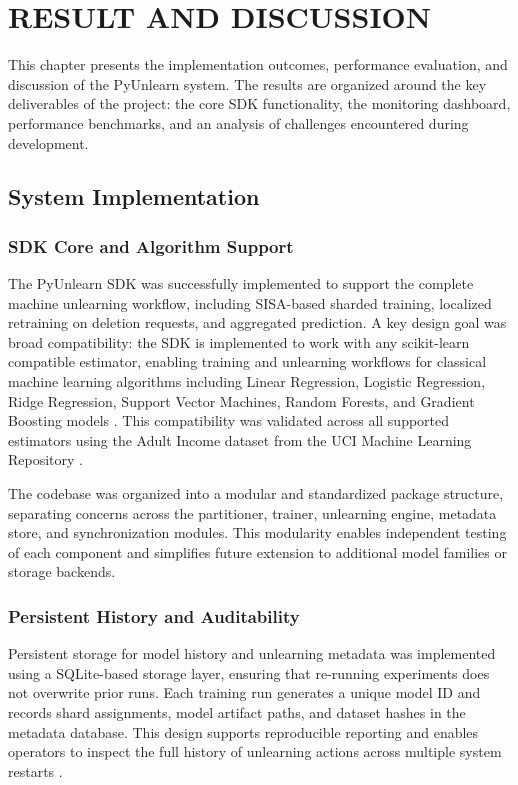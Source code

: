 \chapter{RESULT AND DISCUSSION}
\label{chap:results}

This chapter presents the implementation outcomes, performance evaluation, and discussion of the PyUnlearn system. The results are organized around the key deliverables of the project: the core SDK functionality, the monitoring dashboard, performance benchmarks, and an analysis of challenges encountered during development.

\section{System Implementation}

\subsection{SDK Core and Algorithm Support}

The PyUnlearn SDK was successfully implemented to support the complete machine unlearning workflow, including SISA-based sharded training, localized retraining on deletion requests, and aggregated prediction. A key design goal was broad compatibility: the SDK is implemented to work with any scikit-learn compatible estimator, enabling training and unlearning workflows for classical machine learning algorithms including Linear Regression, Logistic Regression, Ridge Regression, Support Vector Machines, Random Forests, and Gradient Boosting models \cite{bourtoule2021machine}. This compatibility was validated across all supported estimators using the Adult Income dataset from the UCI Machine Learning Repository \cite{dua2019uci}.

The codebase was organized into a modular and standardized package structure, separating concerns across the partitioner, trainer, unlearning engine, metadata store, and synchronization modules. This modularity enables independent testing of each component and simplifies future extension to additional model families or storage backends.

\subsection{Persistent History and Auditability}

Persistent storage for model history and unlearning metadata was implemented using a SQLite-based storage layer, ensuring that re-running experiments does not overwrite prior runs. Each training run generates a unique model ID and records shard assignments, model artifact paths, and dataset hashes in the metadata database. This design supports reproducible reporting and enables operators to inspect the full history of unlearning actions across multiple system restarts \cite{schelter2021heterogeneous}.

